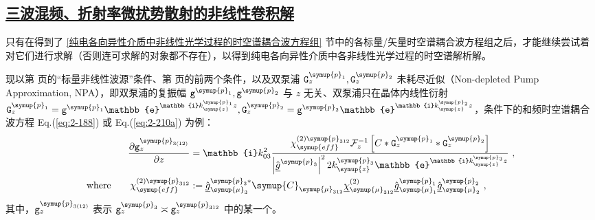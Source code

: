 \subsection{\protect\hyperlink{chap:\thesubsection}{三波混频、折射率微扰势散射的非线性卷积解}}
\label{三波混频、折射率微扰势散射的非线性卷积解}

只有在得到了 \ref{纯电各向异性介质中非线性光学过程的时空谱耦合波方程组} 节中的各标量/矢量时空谱耦合波方程组之后，才能继续尝试着对它们进行求解（否则连可求解的对象都不存在），以得到纯电各向异性介质中各非线性光学过程的时空谱解析解。

现以第 \pageref{con:3} 页的“标量非线性波源”条件、第 \pageref{con:4} 页的前两个条件，以及双泵浦 ${\mathtt{G}}^{\symup{p}_{1}}_{z}, {\mathtt{G}}^{\symup{p}_{2}}_{z}$ 未耗尽近似（Non-depleted Pump Approximation, NPA），即双泵浦的复振幅 ${\mathtt{g}}^{\symup{p}_{1}}, {\mathtt{g}}^{\symup{p}_{2}}$ 与 $z$ 无关、双泵浦只在晶体内线性衍射 ${\mathtt{G}}^{\symup{p}_{1}}_{z} = {\mathtt{g}}^{\symup{p}_{1}} \mathbb{e}^{\mathbb{i} k^{\symup{p}_{1}}_{\symup{z}} z }, {\mathtt{G}}^{\symup{p}_{2}}_{z} = {\mathtt{g}}^{\symup{p}_{2}} \mathbb{e}^{\mathbb{i} k^{\symup{p}_{2}}_{\symup{z}} z }$，条件下\label{con:6}的和频时空谱耦合波方程 Eq.(\ref{eq:2-188}) 或 Eq.(\ref{eq:2-210a}) 为例：
\begin{subequations} \label{eq:2-239}
	\abovedisplayskip=13pt
	\belowdisplayskip=13pt
	\begin{align}
		\displaystyle{\frac{\partial {\mathtt{g}}^{\symup{p}_{3(12)}}_{z}}{\partial z}} &= \mathbb{i} k^{2}_{03} \frac{ \chi^{(2)\symup{p}_{312}}_{\symup{eff}} \mathcal F^{-1}_{z} \left[ C * {\mathtt{G}}^{\symup{p}_{1}}_{z} * {\mathtt{G}}^{\symup{p}_{2}}_{z} \right] }{ \left| \hat{\underline{g}}^{\symup{p}_{3}} \right|^2 2 k^{\symup{p}_{3}}_{\symup{z}} \mathbb{e}^{\mathbb{i} k^{\symup{p}_{3}}_{\symup{z}} z} } \label{eq:2-239a}~, \\ \text{where}\ \ \ \ \ \ \chi^{(2)\symup{p}_{312}}_{\symup{eff}} &:= \hat{\underline{g}}^{\symup{p}_{3}*}_{{{\symup{\mu}}_{3}}} \symup{C}_{{\symup{\mu}}_{312}} \underline{\chi}^{(2)}_{{\symup{\mu}}_{312}} \hat{\underline{g}}^{\symup{p}_{1}}_{{\symup{\mu}}_1} \hat{\underline{g}}^{\symup{p}_{2}}_{{\symup{\mu}}_2} \label{eq:2-239b}~,
	\end{align}
\end{subequations}
其中，${\mathtt{g}}^{\symup{p}_{3(12)}}_{z}$ 表示 ${\mathtt{g}}^{\symup{p}_{3}}_{z} \asymp {\mathtt{g}}^{\symup{p}_{312}}_{z}$ 中的某一个。

